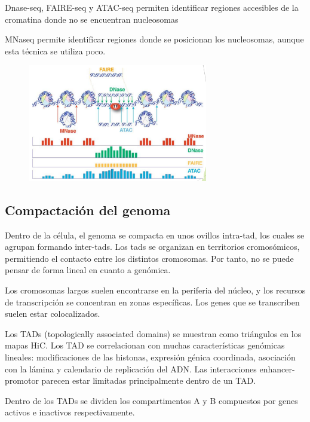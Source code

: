 Dnase-seq, FAIRE-seq y ATAC-seq permiten identificar regiones accesibles de la cromatina donde no se encuentran nucleosomas

MNaseq permite identificar regiones donde se posicionan los nucleosomas, aunque esta técnica se utiliza poco.

\begin{figure}[h]
\centering
\includegraphics[width = 0.7\textwidth]{figs/epig-seqs.png}
\end{figure}

\subsection{Compactación del genoma}
Dentro de la célula, el genoma se compacta en unos ovillos intra-tad, los cuales se agrupan formando inter-tads. Los tads se organizan en territorios cromosómicos, permitiendo el contacto entre los distintos cromosomas. Por tanto, no se puede pensar de forma lineal en cuanto a genómica. 

Los cromosomas largos suelen encontrarse en la periferia del núcleo, y los recursos de transcripción se concentran en zonas específicas. Los genes que se transcriben suelen estar colocalizados. 

Los TADs (topologically associated domains) se muestran como triángulos en los mapas HiC. Los TAD se correlacionan con muchas características genómicas lineales: modificaciones de las histonas, expresión génica coordinada, asociación con la lámina y calendario de replicación del ADN. Las interacciones enhancer-promotor parecen estar limitadas principalmente dentro de un TAD.

Dentro de los TADs se dividen los compartimentos A y B compuestos por genes activos e inactivos respectivamente. 
